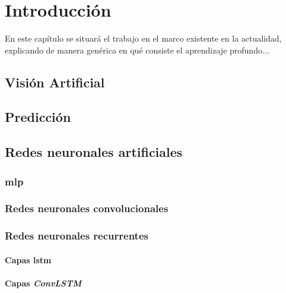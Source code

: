 \chapter{Introducción}\label{cap.introduccion}
En este capítulo se situará el trabajo en el marco existente en la actualidad, explicando de manera genérica en qué consiste el aprendizaje profundo...

\section{Visión Artificial}

\section{Predicción}

\section{Redes neuronales artificiales}
\subsection{\acrfull{mlp}}
\subsection{Redes neuronales convolucionales}
\subsection{Redes neuronales recurrentes}
\subsubsection{Capas \acrfull{lstm}}
\subsubsection{Capas \textit{ConvLSTM}}